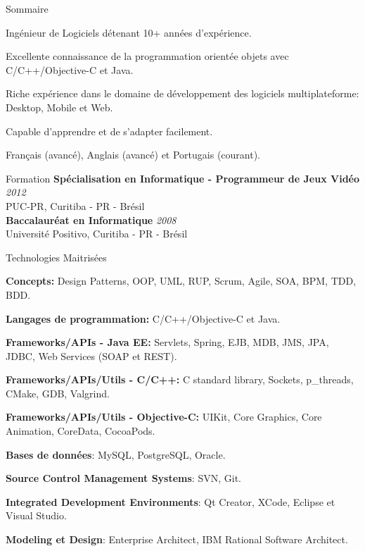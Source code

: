 \documentclass{resume}
\begin{document}
  \begin{rSection}{Sommaire}
     \item Ingénieur de Logiciels détenant 10+ années d’expérience.
     \item Excellente connaissance de la programmation orientée objets avec C/C++/Objective-C et Java.
     \item Riche expérience dans le domaine de développement des logiciels multiplateforme: Desktop, Mobile et Web.
     \item Capable d'apprendre et de s'adapter facilement.
     \item Français (avancé), Anglais (avancé) et Portugais (courant).
  \end{rSection}

  \begin{rSection}{Formation}
    {\bf Spécialisation en Informatique - Programmeur de Jeux Vidéo } \hfill {\em 2012} \\
    {PUC-PR, Curitiba - PR - Brésil} \\ 

    {\bf Baccalauréat en Informatique } \hfill {\em 2008} \\
    {Université Positivo, Curitiba - PR - Brésil}   
  \end{rSection}
  
  \begin{rSection}{Technologies Maitrisées}
    \begin{rSubsection}{}{}{}{}
      \item {\bf Concepts:} Design Patterns, OOP, UML, RUP, Scrum, Agile, SOA, BPM, TDD, BDD.
      \item {\bf Langages de programmation:} C/C++/Objective-C et Java.
      \item {\bf Frameworks/APIs - Java EE:} Servlets, Spring, EJB, MDB, JMS, JPA, JDBC, Web Services (SOAP et REST).
      \item {\bf Frameworks/APIs/Utils - C/C++:} C standard library, Sockets, p\_threads, CMake, GDB, Valgrind.
      \item {\bf Frameworks/APIs/Utils - Objective-C:} UIKit, Core Graphics, Core Animation, CoreData, CocoaPods.
      \item {\bf Bases de données}: MySQL, PostgreSQL, Oracle.
      \item {\bf Source Control Management Systems}: SVN, Git.
      \item {\bf Integrated Development Environments}: Qt Creator, XCode, Eclipse et Visual Studio.
      \item {\bf Modeling et Design}: Enterprise Architect, IBM Rational Software Architect.
    \end{rSubsection}
  \end{rSection}
  
\end{document}
